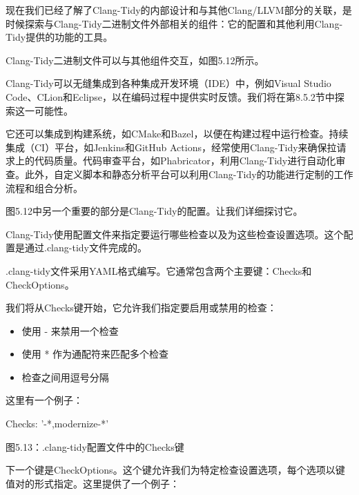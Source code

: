
现在我们已经了解了Clang-Tidy的内部设计和与其他Clang/LLVM部分的关联，是时候探索与Clang-Tidy二进制文件外部相关的组件：它的配置和其他利用Clang-Tidy提供的功能的工具。


Clang-Tidy二进制文件可以与其他组件交互，如图5.12所示。


Clang-Tidy可以无缝集成到各种集成开发环境（IDE）中，例如Visual Studio Code、CLion和Eclipse，以在编码过程中提供实时反馈。我们将在第8.5.2节中探索这一可能性。

它还可以集成到构建系统，如CMake和Bazel，以便在构建过程中运行检查。持续集成（CI）平台，如Jenkins和GitHub Actions，经常使用Clang-Tidy来确保拉请求上的代码质量。代码审查平台，如Phabricator，利用Clang-Tidy进行自动化审查。此外，自定义脚本和静态分析平台可以利用Clang-Tidy的功能进行定制的工作流程和组合分析。

图5.12中另一个重要的部分是Clang-Tidy的配置。让我们详细探讨它。


Clang-Tidy使用配置文件来指定要运行哪些检查以及为这些检查设置选项。这个配置是通过.clang-tidy文件完成的。

.clang-tidy文件采用YAML格式编写。它通常包含两个主要键：Checks和CheckOptions。

我们将从Checks键开始，它允许我们指定要启用或禁用的检查：

\begin{itemize}
\item
使用 - 来禁用一个检查

\item
使用 * 作为通配符来匹配多个检查

\item
检查之间用逗号分隔
\end{itemize}

这里有一个例子：

\begin{shell}
Checks: '-*,modernize-*'
\end{shell}

\begin{center}
图5.13：.clang-tidy配置文件中的Checks键
\end{center}

下一个键是CheckOptions。这个键允许我们为特定检查设置选项，每个选项以键值对的形式指定。这里提供了一个例子：

